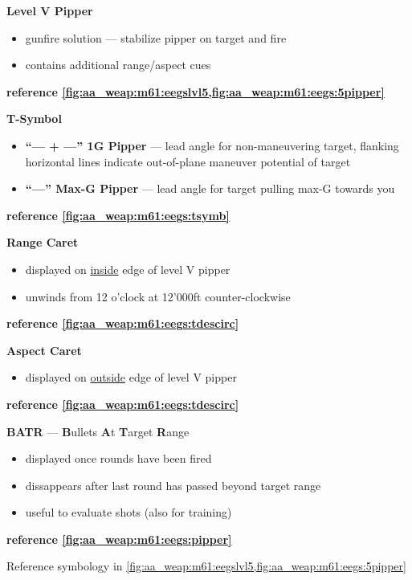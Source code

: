 \begin{tcoloritemize}
{    \begin{subitemize}
        \item \textbf{Level V Pipper}
        \begin{itemize}
            \item gunfire solution --- stabilize pipper on target and fire
            \item contains additional range/aspect cues
        \end{itemize}
        \textbf{reference \cref{fig:aa_weap:m61:eegslvl5,fig:aa_weap:m61:eegs:5pipper}}
        \item \textbf{T-Symbol}
        \begin{itemize}
            \item \textbf{``--- + ---'' 1G Pipper} --- lead angle for non-maneuvering target,
            flanking horizontal lines indicate out-of-plane maneuver potential of target
            \item \textbf{``---'' Max-G Pipper} --- lead angle for target pulling max-G towards you
        \end{itemize}
        \textbf{reference \cref{fig:aa_weap:m61:eegs:tsymb}}
        \item \textbf{Range Caret}
        \begin{itemize}
            \item displayed on \underline{inside} edge of level V pipper
            \item unwinds from 12 o'clock at 12'000ft counter-clockwise
        \end{itemize}
        \textbf{reference \cref{fig:aa_weap:m61:eegs:tdescirc}}
        \item \textbf{Aspect Caret} 
        \begin{itemize}
            \item displayed on \underline{outside} edge of level V pipper
        \end{itemize}
        \textbf{reference \cref{fig:aa_weap:m61:eegs:tdescirc}}
        \item \textbf{BATR} --- \textbf{B}ullets \textbf{A}t \textbf{T}arget \textbf{R}ange
        \begin{itemize}
            \item displayed once rounds have been fired
            \item dissappears after last round has passed beyond target range
            \item useful to evaluate shots (also for training)
        \end{itemize}
        \textbf{reference \cref{fig:aa_weap:m61:eegs:pipper}}
    \end{subitemize}
    
    Reference symbology in \cref{fig:aa_weap:m61:eegslvl5,fig:aa_weap:m61:eegs:5pipper}
    }
\end{tcoloritemize}

